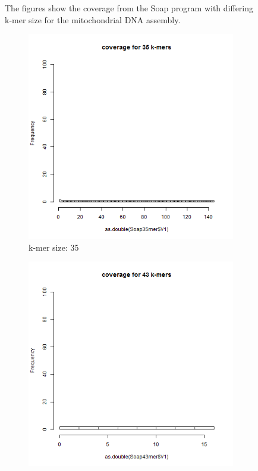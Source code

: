 \documentclass[%
   10pt,              %
   ngerman,           %
   a4paper,           %
   DIV11,             %
]{scrartcl}%
\begin{document}
\begin{figure}[h]
	\caption{The figures show the coverage from the Soap program with differing k-mer size for the mitochondrial DNA assembly.}
		\label{Velvet-Results}
\end{figure}

\begin{figure}[h]
	\begin{subfigure}[t] {0.2\textwidth}
		\includegraphics[width=\textwidth]{exercise2/Soap35merCoverage.png}
		\caption{k-mer size: 35}
		\label{SOAP-25-mers-coverage}
	\end{subfigure}
	\begin{subfigure}[t] {0.2\textwidth}
		\includegraphics[width=\textwidth]{exercise2/Soap43merCoverage.png}

\end{subfigure}
\end{figure}
\end{document}
